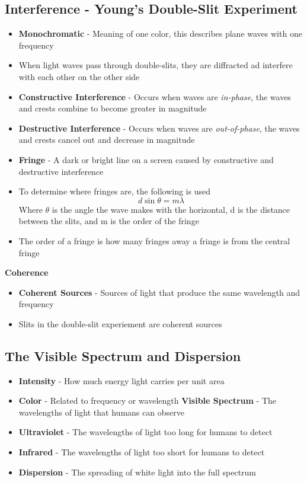 \subsection{Interference - Young's Double-Slit Experiment}
\begin{itemize}
    \item \textbf{Monochromatic} - Meaning of one color, this describes plane waves with one frequency
    \item When light waves pass through double-slits, they are diffracted ad interfere with each other on the other side
    \item \textbf{Constructive Interference} - Occurs when waves are \emph{in-phase}, the waves and crests combine to become greater in magnitude
    \item \textbf{Destructive Interference} - Occurs when waves are \emph{out-of-phase}, the waves and crests cancel out and decrease in magnitude
    \item \textbf{Fringe} - A dark or bright line on a screen caused by constructive and destructive interference
    \item To determine where fringes are, the following is used \[d\sin\theta=m\lambda\] Where \(\theta\) is the angle the wave makes with the horizontal, d is the distance between the slits, and m is the order of the fringe
    \item The order of a fringe is how many fringes away a fringe is from the central fringe
\end{itemize}

\textbf{Coherence}
\begin{itemize}
    \item \textbf{Coherent Sources} - Sources of light that produce the same wavelength and frequency
    \item Slits in the double-slit experiement are coherent sources
\end{itemize}

\subsection{The Visible Spectrum and Dispersion}
\begin{itemize}
    \item \textbf{Intensity} - How much energy light carries per unit area
    \item \textbf{Color} - Related to frequency or wavelength
    \textbf{Visible Spectrum} - The wavelengths of light that humans can observe
    \item \textbf{Ultraviolet} - The wavelengths of light too long for humans to detect
    \item \textbf{Infrared} - The wavelengths of light too short for humans to detect
    \item \textbf{Dispersion} - The spreading of white light into the full spectrum
\end{itemize}

